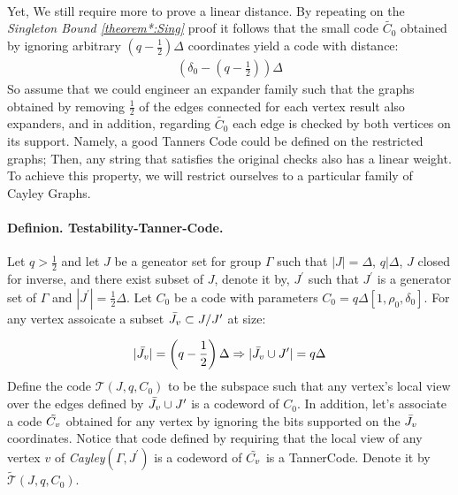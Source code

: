   \paragraph{}

  Yet, We still require more to prove a linear distance. 
  By repeating on the \emph{Singleton Bound \ref{theorem*:Sing} } proof it follows that the small code $\tilde{C_{0}}$ obtained by ignoring arbitrary $ \left( q - \frac{1}{2} \right) \Delta $ coordinates yield a code with distance: 
  \begin{equation*}
    \begin{split}
      \left( \delta_{0} - \left( q - \frac{1}{2} \right) \right)\Delta
    \end{split}
  \end{equation*}
  So assume that we could engineer an expander family such that the graphs obtained by removing $\frac{1}{2}$ of the edges connected for each vertex result also expanders, and in addition, regarding $\tilde{C_{0}}$ each edge is checked by both vertices on its support. Namely, a good Tanners Code could be defined on the restricted graphs; Then, any string that satisfies the original checks also has a linear weight. To achieve this property, we will restrict ourselves to a particular family of Cayley Graphs.  
  \paragraph{Definion. Testability-Tanner-Code.} Let $q > \frac{1}{2}$ and let $J$ be a geneator set for group $\Gamma$ such that $|J| = \Delta$, $q | \Delta $, $J$ closed for inverse, and there exist subset of $J$, denote it by, $J^{\prime}$ such that $J^{\prime}$ is a generator set of $\Gamma$ and $|J^{\prime}| = \frac{1}{2}\Delta$. Let $C_{0}$ be a code with parameters $C_{0} = q\Delta \left[1, \rho_{0}, \delta_{0}\right]$. For any vertex assoicate a subset $\bar{J_{v}} \subset J/J^{\prime}$ at size: 

  \begin{equation*}
    \begin{split}
      |\bar{J_{v}}| = \left( q - \frac{1}{2} \right)\Delta \Rightarrow |\bar{J_{v}} \cup J^{\prime}| = q\Delta
    \end{split}
  \end{equation*}
  Define the code $\mathcal{T}\left(J, q , C_{0}\right)$ to be the subspace such that any vertex's local view over the edges defined by $\bar{J_{v}} \cup J^{\prime}$ is a codeword of $C_{0}$. In addition, let's associate a code $\tilde{C_{v}}$ obtained for any vertex by ignoring the bits supported on the $\bar{J_{v}}$ coordinates. Notice that code defined by requiring that the local view of any vertex $v$ of \emph{Cayley}$\left(\Gamma, J^{\prime} \right)$ is a codeword of $\tilde{C_{v}}$ is a TannerCode. Denote it by $ \tilde{\mathcal{T}}\left(J, q ,C_{0}\right)$.   


